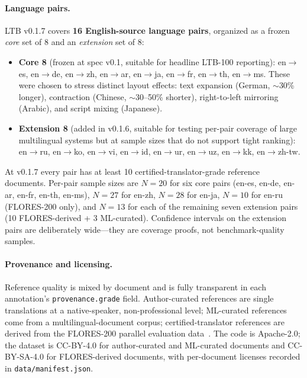 \documentclass[11pt]{article}
\begin{document}
\paragraph{Language pairs.} LTB v0.1.7 covers \textbf{16 English-source language
pairs}, organized as a frozen \emph{core} set of 8 and an \emph{extension} set
of 8:
\begin{itemize}
  \item \textbf{Core 8} (frozen at spec v0.1, suitable for headline LTB-100
  reporting): en$\rightarrow$es, en$\rightarrow$de, en$\rightarrow$zh,
  en$\rightarrow$ar, en$\rightarrow$ja, en$\rightarrow$fr, en$\rightarrow$th,
  en$\rightarrow$ms. These were chosen to stress distinct layout effects: text
  expansion (German, $\sim$30\% longer), contraction (Chinese, $\sim$30--50\%
  shorter), right-to-left mirroring (Arabic), and script mixing (Japanese).
  \item \textbf{Extension 8} (added in v0.1.6, suitable for testing per-pair
  coverage of large multilingual systems but at sample sizes that do not
  support tight ranking): en$\rightarrow$ru, en$\rightarrow$ko,
  en$\rightarrow$vi, en$\rightarrow$id, en$\rightarrow$ur, en$\rightarrow$uz,
  en$\rightarrow$kk, en$\rightarrow$zh-tw.
\end{itemize}
At v0.1.7 every pair has at least 10 certified-translator-grade reference
documents. Per-pair sample sizes are $N=20$ for six core pairs (en-es, en-de,
en-ar, en-fr, en-th, en-ms), $N=27$ for en-zh, $N=28$ for en-ja, $N=10$ for
en-ru (FLORES-200 only), and $N=13$ for each of the remaining seven extension
pairs (10 FLORES-derived + 3 ML-curated). Confidence intervals on the extension
pairs are deliberately wide---they are coverage proofs, not benchmark-quality
samples.

\paragraph{Provenance and licensing.} Reference quality is mixed by document and
is fully transparent in each annotation's \texttt{provenance.grade} field.
Author-curated references are single translations at a native-speaker,
non-professional level; ML-curated references come from a multilingual-document
corpus; certified-translator references are derived from the FLORES-200
parallel evaluation data~\citep{flores200}. The code is Apache-2.0; the dataset is CC-BY-4.0 for
author-curated and ML-curated documents and CC-BY-SA-4.0 for FLORES-derived
documents, with per-document licenses recorded in \texttt{data/manifest.json}.
\end{document}
